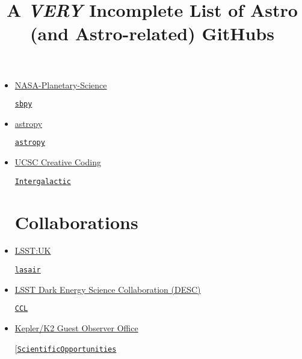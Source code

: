 \documentclass[11pt,a4paper]{article}
\begin{document}
\title{A {\it VERY} Incomplete List of Astro (and Astro-related) GitHubs}
\maketitle



\begin{itemize}


\section*{Organisations}  

\item \href{https://github.com/NASA-Planetary-Science}{NASA-Planetary-Science}
  \begin{itemize}
    \href{https://github.com/NASA-Planetary-Science/sbpy}{{\tt sbpy}}
  \end{itemize}
  
\item \href{https://github.com/astropy}{astropy}
  \begin{itemize}
    \href{https://github.com/astropy/astropy}{{\tt astropy}}
  \end{itemize}

\item \href{https://github.com/CreativeCodingLab}{UCSC Creative Coding}
  \begin{itemize}
    \href{https://github.com/CreativeCodingLab/Intergalactic}{{\tt Intergalactic}}
  \end{itemize}



\section*{Collaborations}  
\item \href{https://github.com/lsst-uk}{LSST:UK}
  \begin{itemize}
    \href{https://github.com/lsst-uk/lasair/}{{\tt lasair}}
  \end{itemize}

\item \href{https://github.com/LSSTDESC}{LSST Dark Energy Science Collaboration (DESC)}
  \begin{itemize}
    \href{https://github.com/LSSTDESC/CCL}{{\tt CCL}}
  \end{itemize}

\item \href{https://github.com/KeplerGO/}{Kepler/K2 Guest Observer Office}
  \begin{itemize}
    \href{https://github.com/KeplerGO/ScientificOpportunities}{[\tt ScientificOpportunities}
  \end{itemize}
  


\end{itemize}
\end{document}
